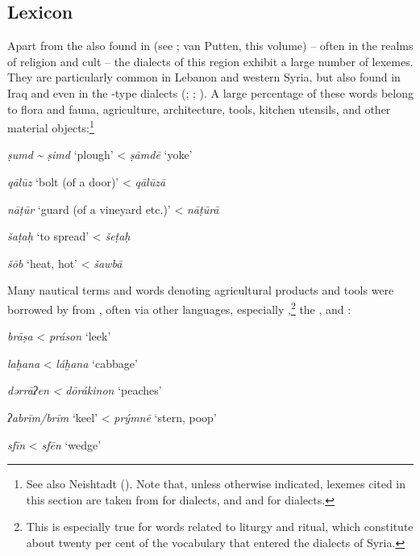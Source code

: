 \documentclass[output=paper]{langsci/langscibook}
\begin{document}
  \subsection{Lexicon} 
Apart from the   also found in   (see \citealt{Retsö2011}; van Putten, this volume) – often in the realms of religion and cult – the dialects of this region exhibit a large number of  lexemes. They are particularly common in Lebanon and western Syria, but also found in Iraq and even in the -type dialects (\citealt{Féghali1918}; \citealt{Borg2004}; \citeyear{Borg2008}). A large percentage of these words belong to flora and fauna, agriculture, architecture, tools, kitchen utensils, and other material objects:\footnote{See also Neishtadt (\citeyear[282]{Neishtadt2015}). Note that, unless otherwise indicated, lexemes cited in this section are taken from \citet{Barthélemy1935} for  dialects, and \citet{WoodheadEtAl1967} and \citet{alBakri1972} for  dialects.}

\ea
\textit{ṣumd} \textit{{\textasciitilde} ṣimd} ‘plough’ <  \textit{ṣāmdē} ‘yoke’

\textit{qālūz} ‘bolt (of a door)’ <  \textit{qālūzā}

\textit{nāṭūr} ‘guard (of a vineyard etc.)’ <  \textit{nāṭūrā}

\textit{šaṭaḥ} ‘to spread’ <  \textit{šeṭaḥ}

\textit{šōb} ‘heat, hot’ <  \textit{šawbā}
\z

Many nautical terms and words denoting agricultural products and tools were borrowed by  from , often via other languages, especially ,\footnote{This is especially true for words related to  liturgy and ritual, which constitute about twenty per cent of the  vocabulary that entered the dialects of Syria.} the , and : 

\ea
\textit{brāṣa} <  \textit{práson} ‘leek’ 

\textit{laḫana} <  \textit{láḫana} ‘cabbage’

\textit{dərrāʔen} \textit{<}  \textit{dōrákinon} ‘peaches’

\textit{ʔabrīm/brīm} ‘keel’ <  \textit{prýmnē} ‘stern, poop’

\textit{sfīn} <  \textit{sfēn} ‘wedge’
\z
\end{document}
